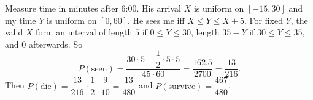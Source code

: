 Measure time in minutes after 6:00. His arrival $X$ is uniform on $[-15,30]$ and my time $Y$ is uniform on $[0,60]$. He sees me iff $X\le Y\le X+5$. For fixed $Y$, the valid $X$ form an interval of length $5$ if $0\le Y\le30$, length $35-Y$ if $30\le Y\le35$, and $0$ afterwards. So
\[P(\text{seen})=\dfrac{30\cdot5+\dfrac12\cdot5\cdot5}{45\cdot60}=\dfrac{162.5}{2700}=\dfrac{13}{216}.\]
Then $P(\text{die})=\dfrac{13}{216}\cdot\dfrac12\cdot\dfrac9{10}=\dfrac{13}{480}$ and $P(\text{survive})=\boxed{\dfrac{467}{480}}$.

